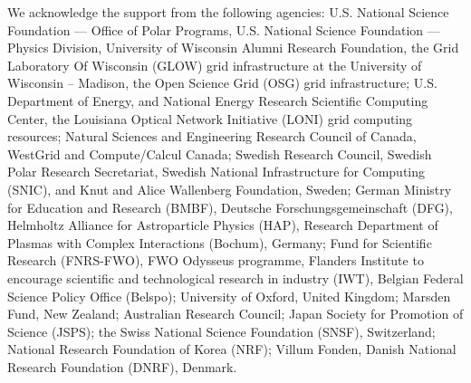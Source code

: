 \acknowledgments

We acknowledge the support from the following agencies: U.S. National
Science Foundation --- Office of Polar Programs, U.S. National Science
Foundation --- Physics Division, University of Wisconsin Alumni Research
Foundation, the Grid Laboratory Of Wisconsin (GLOW) grid infrastructure at
the University of Wisconsin -- Madison, the Open Science Grid (OSG) grid
infrastructure; U.S. Department of Energy, and National Energy Research
Scientific Computing Center, the Louisiana Optical Network Initiative
(LONI) grid computing resources; Natural Sciences and Engineering Research
Council of Canada, WestGrid and Compute/Calcul Canada; Swedish Research
Council, Swedish Polar Research Secretariat, Swedish National
Infrastructure for Computing (SNIC), and Knut and Alice Wallenberg
Foundation, Sweden; German Ministry for Education and Research (BMBF),
Deutsche Forschungsgemeinschaft (DFG), Helmholtz Alliance for Astroparticle
Physics (HAP), Research Department of Plasmas with Complex Interactions
(Bochum), Germany; Fund for Scientific Research (FNRS-FWO), FWO Odysseus
programme, Flanders Institute to encourage scientific and technological
research in industry (IWT), Belgian Federal Science Policy Office (Belspo);
University of Oxford, United Kingdom; Marsden Fund, New Zealand; Australian
Research Council; Japan Society for Promotion of Science (JSPS); the Swiss
National Science Foundation (SNSF), Switzerland; National Research
Foundation of Korea (NRF); Villum Fonden, Danish National Research
Foundation (DNRF), Denmark.

